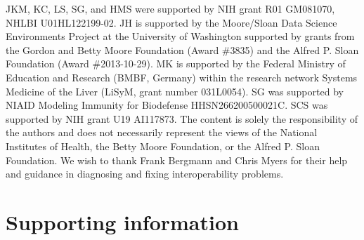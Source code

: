 \documentclass[10pt,letterpaper]{article}
\newcommand{\beginsupplement}{%
        \setcounter{table}{0}
        \renewcommand{\thetable}{S\arabic{table}}%
        \setcounter{figure}{0}
        \renewcommand{\thefigure}{S\arabic{figure}}%
     }
\begin{document}
JKM, KC, LS, SG, and HMS were supported by NIH grant R01 GM081070, NHLBI U01HL122199-02. JH is supported by the Moore/Sloan Data Science Environments Project at the University of Washington supported by grants from the Gordon and Betty Moore Foundation (Award \#3835) and the Alfred P. Sloan Foundation (Award \#2013-10-29). MK is supported by the Federal Ministry of Education and Research (BMBF, Germany) within the research network Systems Medicine of the Liver (LiSyM, grant number 031L0054). SG was supported by NIAID Modeling Immunity for Biodefense HHSN266200500021C. SCS was supported by NIH grant U19 AI117873. The content is solely the responsibility of the authors and does not necessarily represent the views of the National Institutes of Health, the Betty Moore Foundation, or the Alfred P. Sloan Foundation.
We wish to thank Frank Bergmann and Chris Myers for their help and guidance in diagnosing and fixing interoperability problems.

\section*{Supporting information}



\beginsupplement

\end{document}
